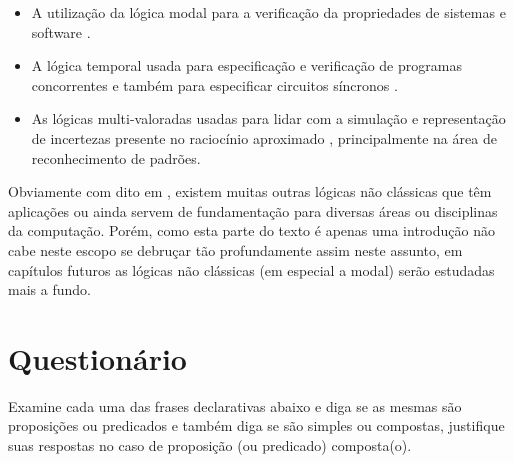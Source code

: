 \begin{itemize}
	\item A utilização da lógica modal para a verificação da propriedades de sistemas e software \cite{harel1979}.
	\item A lógica temporal usada para especificação e verificação de programas
concorrentes \cite{manna1979} e também para especificar circuitos síncronos \cite{halpern1983}.
	\item As lógicas multi-valoradas usadas para lidar com a simulação e representação de
incertezas presente no raciocínio aproximado \cite{BenjaV1}, principalmente na área de reconhecimento de padrões.
\end{itemize}

Obviamente com dito em \cite{BenjaV1}, existem muitas outras lógicas não clássicas que têm aplicações ou ainda servem de fundamentação para diversas áreas ou disciplinas da computação. Porém, como esta parte do texto é apenas uma introdução não cabe neste escopo se debruçar tão profundamente assim neste assunto, em capítulos futuros as lógicas não clássicas (em especial a modal) serão estudadas mais a fundo. 

\section{Questionário}\label{sec:Questionario1part3}

\begin{problem}\label{prob:IntroLogica1}
    Examine cada uma das frases declarativas abaixo e diga se as mesmas são proposições ou predicados e também diga se são simples ou compostas, justifique suas respostas no caso de proposição (ou predicado) composta(o).
\end{problem}

